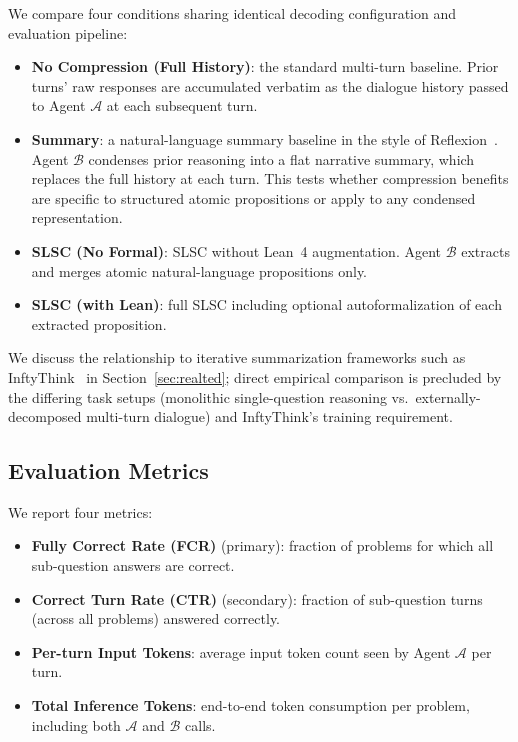We compare four conditions sharing identical decoding configuration and evaluation pipeline:

\begin{itemize}[noitemsep,topsep=2pt]
  \item \textbf{No Compression (Full History)}: the standard multi-turn baseline. Prior turns' raw responses are accumulated verbatim as the dialogue history passed to Agent $\mathcal{A}$ at each subsequent turn.
  \item \textbf{Summary}: a natural-language summary baseline in the style of Reflexion~\citep{shinn2023reflexion}. Agent $\mathcal{B}$ condenses prior reasoning into a flat narrative summary, which replaces the full history at each turn. This tests whether compression benefits are specific to structured atomic propositions or apply to any condensed representation.
  \item \textbf{SLSC (No Formal)}: SLSC without Lean~4 augmentation. Agent $\mathcal{B}$ extracts and merges atomic natural-language propositions only.
  \item \textbf{SLSC (with Lean)}: full SLSC including optional autoformalization of each extracted proposition.
\end{itemize}

We discuss the relationship to iterative summarization frameworks such as InftyThink~\citep{yan2025inftythink} in Section~\ref{sec:realted}; direct empirical comparison is precluded by the differing task setups (monolithic single-question reasoning vs.\ externally-decomposed multi-turn dialogue) and InftyThink's training requirement.

\subsection{Evaluation Metrics}
\label{sec:metrics}

We report four metrics:

\begin{itemize}[noitemsep,topsep=2pt]
  \item \textbf{Fully Correct Rate (FCR)} (primary): fraction of problems for which all sub-question answers are correct.
  \item \textbf{Correct Turn Rate (CTR)} (secondary): fraction of sub-question turns (across all problems) answered correctly.
  \item \textbf{Per-turn Input Tokens}: average input token count seen by Agent $\mathcal{A}$ per turn.
  \item \textbf{Total Inference Tokens}: end-to-end token consumption per problem, including both $\mathcal{A}$ and $\mathcal{B}$ calls.
\end{itemize}

